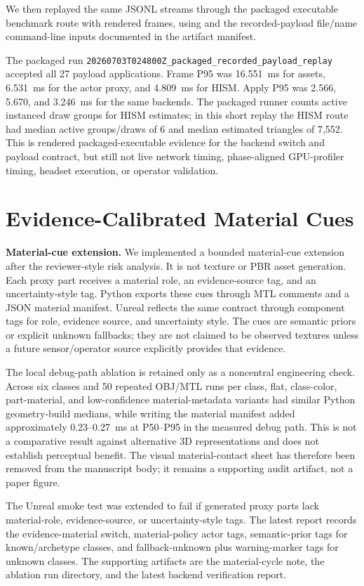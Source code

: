 ﻿\documentclass[11pt,a4paper]{article}
\begin{document}
We then replayed the same JSONL streams through the packaged executable
benchmark route with rendered frames, using
 and the
recorded-payload file/name command-line inputs documented in the artifact
manifest.

The packaged run \texttt{20260703T024800Z\_packaged\_recorded\_payload\_replay}
accepted all 27 payload applications. Frame P95 was 16.551~ms for assets,
6.531~ms for the actor proxy, and 4.809~ms for HISM. Apply P95 was 2.566,
5.670, and 3.246~ms for the same backends. The packaged runner counts active
instanced draw groups for HISM estimates; in this short replay the HISM route had median active
groups/draws of 6 and median estimated triangles of 7,552. This is rendered
packaged-executable evidence for the backend switch and payload contract, but
still not live network timing, phase-aligned GPU-profiler timing, headset execution, or
operator validation.

\section{Evidence-Calibrated Material Cues}

\noindent\textbf{Material-cue extension.} We implemented a bounded material-cue
extension after the reviewer-style risk analysis. It is not texture or PBR
asset generation. Each proxy part receives a material role, an evidence-source
tag, and an uncertainty-style tag. Python exports these cues through MTL
comments and a JSON material manifest. Unreal reflects the same contract through
component tags for role, evidence source, and uncertainty style. The cues are
semantic priors or explicit unknown fallbacks; they are not claimed to be
observed textures unless a future sensor/operator source explicitly provides
that evidence.

The local debug-path ablation is retained only as a noncentral engineering
check. Across six classes and 50 repeated OBJ/MTL runs per class, flat,
class-color, part-material, and low-confidence material-metadata variants had
similar Python geometry-build medians, while writing the material manifest added
approximately 0.23--0.27~ms at P50--P95 in the measured debug path. This is not
a comparative result against alternative 3D representations and does not
establish perceptual benefit. The visual material-contact sheet has therefore
been removed from the manuscript body; it remains a supporting audit artifact,
not a paper figure.

The Unreal smoke test was extended to fail if generated proxy parts lack
material-role, evidence-source, or uncertainty-style tags. The latest report
records the evidence-material switch, material-policy actor tags,
semantic-prior tags for known/archetype classes, and fallback-unknown plus
warning-marker tags for unknown classes. The supporting artifacts are the
material-cycle note, the ablation run directory, and the latest backend
verification report.
\end{document}
